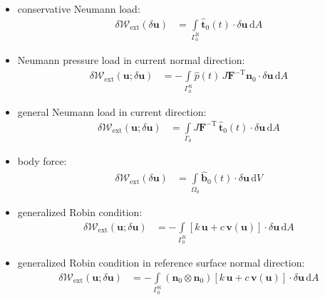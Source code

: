 \documentclass[a4paper,12pt]{report}
\newcommand{\bs}[1]{\boldsymbol{#1}}
\newcommand{\Om}{\mathit{\Omega}}
\newcommand{\Gm}{\mathit{\Gamma}}
\begin{document}
\begin{itemize}
\item conservative Neumann load:
\begin{equation}
\label{equation-deltaw-ext-pk1}
\begin{aligned}
\delta \mathcal{W}_{\mathrm{ext}}(\delta\bs{u}) &= \int\limits_{\Gm_{0}^{\mathrm{N}}} \hat{\bs{t}}_{0}(t) \cdot \delta\bs{u} \,\mathrm{d}A
\end{aligned}
\end{equation}
\item Neumann pressure load in current normal direction:
\begin{equation}
\label{equation-deltaw-ext-cur-p}
\begin{aligned}
\delta \mathcal{W}_{\mathrm{ext}}(\bs{u};\delta\bs{u}) &= -\int\limits_{\Gm_{0}^{\mathrm{N}}} \hat{p}(t)\,J \bs{F}^{-\mathrm{T}}\bs{n}_{0} \cdot \delta\bs{u} \,\mathrm{d}A \end{aligned}
\end{equation}
\item general Neumann load in current direction:
\begin{equation}
\label{equation-deltaw-ext-cur}
\begin{aligned}
\delta \mathcal{W}_{\mathrm{ext}}(\bs{u};\delta\bs{u}) &= \int\limits_{\Gm_0} J\boldsymbol{F}^{-\mathrm{T}}\,\hat{\boldsymbol{t}}_{0}(t) \cdot \delta\boldsymbol{u} \,\mathrm{d}A
\end{aligned}
\end{equation}
\item body force:
\begin{equation}
\label{equation-deltaw-ext-body}
\begin{aligned}
\delta \mathcal{W}_{\mathrm{ext}}(\delta\bs{u}) &= \int\limits_{\Om_{0}} \hat{\bs{b}}_{0}(t) \cdot \delta\bs{u} \,\mathrm{d}V
\end{aligned}
\end{equation}

\item generalized Robin condition:
\begin{equation}
\label{equation-deltaw-ext-robin}
\begin{aligned}
\delta \mathcal{W}_{\mathrm{ext}}(\bs{u};\delta\bs{u}) &= -\int\limits_{\Gm_{0}^{\mathrm{N}}} \left[k\,\bs{u} + c\,\bs{v}(\bs{u})\right] \cdot \delta\bs{u}\,\mathrm{d}A
\end{aligned}
\end{equation}
\item generalized Robin condition in reference surface normal direction:
\begin{equation}
\label{equation-deltaw-ext-robin-n}
\begin{aligned}
\delta \mathcal{W}_{\mathrm{ext}}(\bs{u};\delta\bs{u}) &= -\int\limits_{\Gm_{0}^{\mathrm{N}}} (\bs{n}_0 \otimes \bs{n}_0)\left[k\,\bs{u} + c\,\bs{v}(\bs{u})\right] \cdot \delta\bs{u}\,\mathrm{d}A
\end{aligned}
\end{equation}


\end{itemize}
\end{document}
